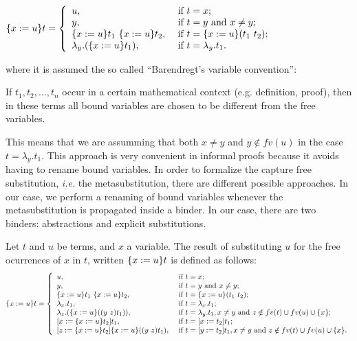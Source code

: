 \vspace{.5cm}
$\metasub{t}{x}{u} = \left\{
 \begin{array}{ll}
  u, & \mbox{ if } t = x; \\
  y, & \mbox{ if } t = y \mbox{ and } x \neq y; \\
  \metasub{t_1}{x}{u}\ \metasub{t_2}{x}{u}, & \mbox{ if } t = \metasub{(t_1\ t_2)}{x}{u}; \\
  \lambda_y.(\metasub{t_1}{x}{u}), & \mbox{ if } t = \lambda_y.t_1.
 \end{array}\right.$ \vspace{.5cm}


\noindent where it is assumed the so called ``Barendregt's variable convention'':


\begin{tcolorbox}
 If $t_1, t_2, \ldots, t_n$ occur in a certain mathematical context (e.g. definition, proof), then in these terms all bound variables are chosen to be different from the free variables.  
\end{tcolorbox}


This means that we are assumming that both $x \neq y$ and $y\notin fv(u)$ in the case $t = \lambda_y.t_1$. This approach is very convenient in informal proofs because it avoids having to rename bound variables. In order to formalize the capture free substitution, {\it i.e.} the metasubstitution, there are different possible approaches. In our case, we perform a renaming of bound variables whenever the metasubstitution is propagated inside a binder. In our case, there are two binders: abstractions and explicit substitutions.


Let $t$ and $u$ be terms, and $x$ a variable. The result of substituting $u$ for the free ocurrences of $x$ in $t$, written $\metasub{t}{x}{u}$ is defined as follows:\newline
\begin{equation}\label{msubst}
\metasub{t}{x}{u} = \left\{
 \begin{array}{ll}
  u, & \mbox{ if } t = x; \\
  y, & \mbox{ if } t = y \mbox{ and } x \neq y; \\
  \metasub{t_1}{x}{u}\ \metasub{t_2}{x}{u}, & \mbox{ if } t = \metasub{(t_1\ t_2)}{x}{u}; \\
  \lambda_x.t_1, & \mbox{ if } t = \lambda_x.t_1; \\
  \lambda_z.(\metasub{(\swap{y}{z}{t_1})}{x}{u}), & \mbox{ if } t = \lambda_y.t_1, x \neq y \mbox{ and } z\notin fv(t)\cup fv(u) \cup \{x\}; \\
  \esub{t_1}{x}{\metasub{t_2}{x}{u}}, & \mbox{ if } t = \esub{t_1}{x}{t_2}; \\
  \esub{\metasub{(\swap{y}{z}{t_1})}{x}{u}}{z}{\metasub{t_2}{x}{u}}, & \mbox{ if } t = \esub{t_1}{y}{t_2}, x \neq y \mbox{ and } z\notin fv(t)\cup fv(u) \cup \{x\}.
 \end{array}\right.
\end{equation}


